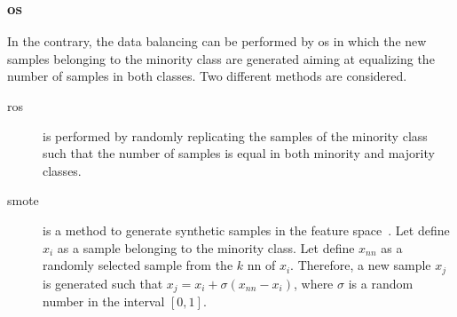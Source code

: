 \subsubsection{\acl{os}}

\noindent In the contrary, the data balancing can be performed by \ac{os} in which the new samples belonging to the minority class are generated aiming at equalizing the number of samples in both classes.
Two different methods are considered.

\begin{description}
\item[\Ac{ros}] is performed by randomly replicating the samples of the minority class such that the number of samples is equal in both minority and majority classes.
\item[\Ac{smote}] is a method to generate synthetic samples in the feature space~\cite{chawla2002smote}.
Let define $x_i$ as a sample belonging to the minority class.
Let define $x_{nn}$ as a randomly selected sample from the $k$ \ac{nn} of $x_i$.
Therefore, a new sample $x_j$ is generated such that $x_j = x_i + \sigma \left( x_{nn} - x_i \right)$, where $\sigma$ is a random number in the interval $\left[0,1\right]$.
\end{description}



